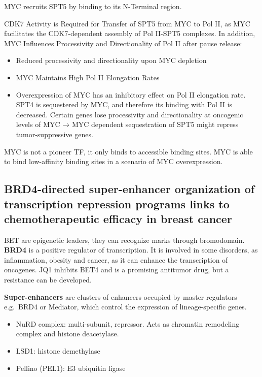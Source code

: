 MYC recruits SPT5 by binding to its N-Terminal region.

CDK7 Activity is Required for Transfer of SPT5 from MYC to Pol II, as MYC facilitates the CDK7-dependent assembly of Pol II-SPT5 complexes.
In addition, MYC Influences Processivity and Directionality of Pol II after pause release:

\begin{itemize}
\tightlist
\item
  Reduced processivity and directionality upon MYC depletion
\item
  MYC Maintains High Pol II Elongation Rates
\item
  Overexpression of MYC has an inhibitory effect on Pol II elongation
  rate. SPT4 is sequestered by MYC, and therefore its binding with Pol
  II is decreased. Certain genes lose processivity and directionality at
  oncogenic levels of MYC → MYC dependent sequestration of SPT5 might
  repress tumor-suppressive genes.
\end{itemize}

MYC is not a pioneer TF, it only binds to accessible binding sites. MYC is able to bind low-affinity binding sites in a scenario of MYC overexpression.


\subsection{BRD4-directed super-enhancer organization of transcription repression programs links to chemotherapeutic efficacy in breast cancer}

BET are epigenetic leaders, they can recognize marks through
bromodomain. \textbf{BRD4} is a positive regulator of transcription. It
is involved in some disorders, as inflammation, obesity and cancer, as
it can enhance the transcription of oncogenes. JQ1 inhibits BET4 and is
a promising antitumor drug, but a resistance can be developed.

\textbf{Super-enhancers} are clusters of enhancers occupied by master
regulators e.g.~BRD4 or Mediator, which control the expression of
lineage-specific genes.
\begin{itemize}
\tightlist
\item
  NuRD complex: multi-subunit, repressor. Acts as chromatin remodeling
  complex and histone deacetylase.
\item
  LSD1: histone demethylase
\item
  Pellino (PEL1): E3 ubiquitin ligase
\end{itemize}

